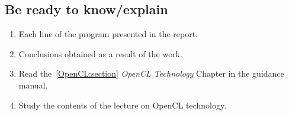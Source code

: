 { %
	\subsection{Be ready to know/explain}
	\begin{enumerate}
		\item Each line of the program presented in the report.
		\item Conclusions obtained as a result of the work.
		\item Read the~\ref{OpenCL:section} \textit{OpenCL Technology} Chapter in the guidance manual.
		\item Study the contents of the lecture on OpenCL technology.
	\end{enumerate}
}
